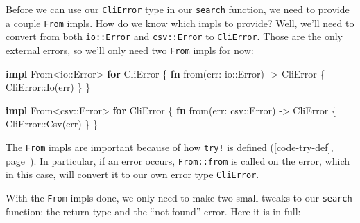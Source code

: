 \documentclass[a4paper,]{book}
\renewcommand*{\hyperlink}[2]{%
 #2 (\autoref{#1}, page~\pageref{#1})}
\newenvironment{Shaded}{\begin{snugshade}}{\end{snugshade}}
\newcommand{\KeywordTok}[1]{\textcolor[rgb]{0.13,0.29,0.53}{\textbf{{#1}}}}
\newcommand{\NormalTok}[1]{{#1}}
\begin{document}
Before we can use our \texttt{CliError} type in our \texttt{search}
function, we need to provide a couple \texttt{From} impls. How do we
know which impls to provide? Well, we'll need to convert from both
\texttt{io::Error} and \texttt{csv::Error} to \texttt{CliError}. Those
are the only external errors, so we'll only need two \texttt{From} impls
for now:

\begin{Shaded}
\begin{Highlighting}[]
\KeywordTok{impl} \NormalTok{From<io::Error> }\KeywordTok{for} \NormalTok{CliError \{}
    \KeywordTok{fn} \NormalTok{from(err: io::Error) -> CliError \{}
        \NormalTok{CliError::Io(err)}
    \NormalTok{\}}
\NormalTok{\}}

\KeywordTok{impl} \NormalTok{From<csv::Error> }\KeywordTok{for} \NormalTok{CliError \{}
    \KeywordTok{fn} \NormalTok{from(err: csv::Error) -> CliError \{}
        \NormalTok{CliError::Csv(err)}
    \NormalTok{\}}
\NormalTok{\}}
\end{Highlighting}
\end{Shaded}

The \texttt{From} impls are important because of how
\protect\hyperlink{code-try-def}{\texttt{try!} is defined}. In
particular, if an error occurs, \texttt{From::from} is called on the
error, which in this case, will convert it to our own error type
\texttt{CliError}.

With the \texttt{From} impls done, we only need to make two small tweaks
to our \texttt{search} function: the return type and the ``not found''
error. Here it is in full:
\end{document}
